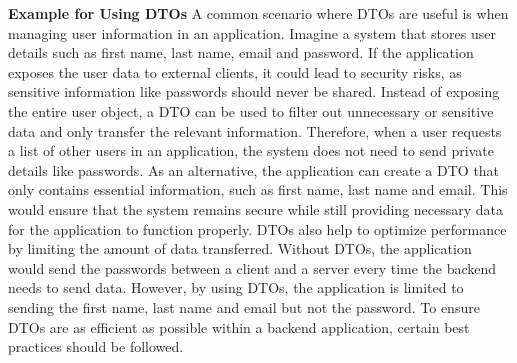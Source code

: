     \textbf{Example for Using DTOs} \newline
    A common scenario where DTOs are useful is when managing user information in an application. \newline
    Imagine a system that stores user details such as first name, last name, email and password. If the application exposes the user data to external clients, it could lead to security risks, as sensitive information like passwords should never be shared. Instead of exposing the entire user object, a DTO can be used to filter out unnecessary or sensitive data and only transfer the relevant information. \newline
    Therefore, when a user requests a list of other users in an application, the system does not need to send private details like passwords. As an alternative, the application can create a DTO that only contains essential information, such as first name, last name and email. This would ensure that the system remains secure while still providing necessary data for the application to function properly. \newline
    DTOs also help to optimize performance by limiting the amount of data transferred. Without DTOs, the application would send the passwords between a client and a server every time the backend needs to send data. However, by using DTOs, the application is limited to sending the first name, last name and email but not the password. \newline 
    To ensure DTOs are as efficient as possible within a backend application, certain best practices should be followed.

    \blankLine

